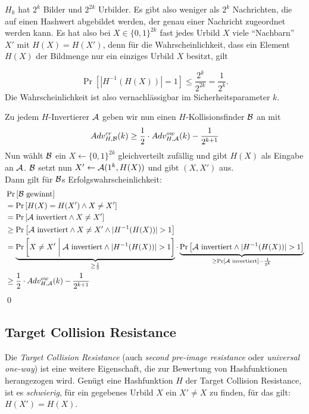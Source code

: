 \begin{beweisidee}
$H_k$ hat $2^k$ Bilder und $2^{2k}$ Urbilder. Es gibt also weniger als
$2^k$ Nachrichten, die auf einen Hashwert abgebildet werden, der genau einer
Nachricht zugeordnet werden kann. Es hat also bei $X \in \{0,1\}^{2k}$ fast jedes
Urbild $X$ viele "`Nachbarn"' $X'$ mit $H(X) = H(X')$, denn für die
Wahrscheinlichkeit, dass ein Element $H(X)$ der Bildmenge nur ein
einziges Urbild $X$ besitzt, gilt

\begin{equation*}
\Pr \left[ | H^{-1}(H(X))| = 1\right] \leq \frac{2^k}{2^{2k}} = \frac{1}{2^k}.
\end{equation*}
Die Wahrscheinlichkeit ist also vernachlässigbar im Sicherheitsparameter
$k$.
\end{beweisidee}

\begin{beweis}
Zu jedem $H$-Invertierer $\mathcal{A}$ geben wir nun einen $H$-Kollisionsfinder $\mathcal{B}$ an mit
\begin{equation*}
Adv^{cr}_{H,\mathcal{B}}(k) \geq \frac{1}{2} \cdot Adv^{ow}_{H,\mathcal{A}}(k) - \frac{1}{2^{k+1}}
\end{equation*} 
Nun wählt $\mathcal{B}$ ein $X \leftarrow \{0,1\}^{2k}$ gleichverteilt zufällig und gibt $H(X)$ als Eingabe an $\mathcal{A}$. $\mathcal{B}$ setzt nun $X' \leftarrow \mathcal{A}(1^k, H(X))$ und
gibt $(X, X')$ aus.\\
Dann gilt für $\mathcal{B}$s Erfolgswahrscheinlichkeit:
\begin{align*}
	&\Pr \left[\mathcal{B} \text{ gewinnt}\right]\\
	&= \Pr\left[H(X) = H(X') \land X \not = X'\right]\\
	&= \Pr \left[\mathcal{A} \text{ invertiert} \land X \not = X'\right]\\
	&\geq \Pr \left[\mathcal{A} \text{ invertiert} \land X \not = X' \land \vert H^{-1}(H(X)) \vert > 1\right]\\
	&= \underbrace{\Pr \left[X \not = X' \biggm| \mathcal{A} \text{ invertiert} \land \vert H^{-1}(H(X)) \vert > 1\right]}_{\geq \frac{1}{2}}
	\cdot \underbrace{\Pr \left[\mathcal{A} \text{ invertiert} \land \vert H^{-1}(H(X)) \vert > 1\right]}_{\geq \Pr \left[\mathcal{A} \text{ invertiert}\right] - \frac{1}{2^k}}\\
	&\geq \frac{1}{2} \cdot Adv^{ow}_{H,\mathcal{A}}(k) - \frac{1}{2^{k+1}}
\end{align*}
\qed
\end{beweis}


\subsection{Target Collision Resistance}
Die \emph{Target Collision Resistance} \indexTargetCollisionResistance (auch \emph{second pre-image resistance} oder \emph{universal one-way}) ist eine weitere Eigenschaft, die zur
Bewertung von Hashfunktionen herangezogen wird. Genügt eine Hashfunktion $H$ der Target Collision Resistance, ist es \textit{schwierig}, für ein gegebenes
Urbild $X$ ein $X' \not = X$ zu finden, für das gilt: $H(X') = H(X)$.

